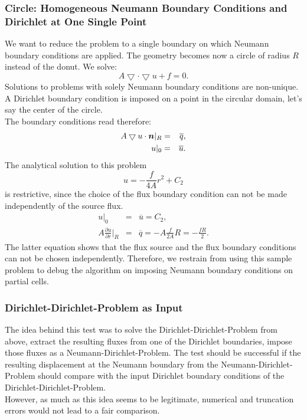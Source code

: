 \documentclass[a4paper,12pt]{article}
\newcommand{\mb}[1]{{\mbox{\boldmath$#1$\unboldmath}}}
\begin{document}
\subsubsection{Circle: Homogeneous Neumann Boundary Conditions and Dirichlet at One Single Point}
We want to reduce the problem to a single boundary on which Neumann boundary conditions are applied. The geometry becomes now a circle of radius $R$ instead of the donut. We solve:
\begin{equation}
A\bigtriangledown\cdot\bigtriangledown u + f = 0.
\end{equation}
Solutions to problems with solely Neumann boundary conditions are non-unique. A Dirichlet boundary condition is imposed on a point in the circular domain, let's say the center of the circle.\\
The boundary conditions read therefore:
\begin{eqnarray}
A\bigtriangledown u \cdot \mb{n}\vert_{R} &=& \overline{q},\\
u\vert_{0} &=& \overline{u}.
\end{eqnarray}
The analytical solution to this problem
\begin{equation}
u = -\frac{f}{4A}r^2 + C_2
\end{equation}
is restrictive, since the choice of the flux boundary condition can not be made independently of the source flux. 
\begin{eqnarray}
u\vert_0 &=& \overline{u} = C_2,\\
A\frac{\partial u}{\partial r}\vert_R &=& \overline{q} = -A\frac{f}{2A}R = -\frac{fR}{2}.
\end{eqnarray}
The latter equation shows that the flux source and the flux boundary conditions can not be chosen independently. Therefore, we restrain from using this sample problem to debug the algorithm on imposing Neumann boundary conditions on partial cells. 
\subsubsection{Dirichlet-Dirichlet-Problem as Input}
The idea behind this test was to solve the Dirichlet-Dirichlet-Problem from above, extract the resulting fluxes from one of the Dirichlet boundaries, impose those fluxes as a Neumann-Dirichlet-Problem. The test should be successful if the resulting displacement at the Neumann boundary from the Neumann-Dirichlet-Problem should compare with the input Dirichlet boundary conditions of the Dirichlet-Dirichlet-Problem. \\
However, as much as this idea seems to be legitimate, numerical and truncation errors would not lead to a fair comparison. 
\end{document}
